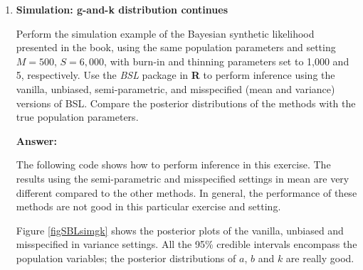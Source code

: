 \begin{enumerate}[leftmargin=*]
\begin{tcolorbox}[enhanced,width=4.67in,center upper,
	fontupper=\large\bfseries,drop shadow southwest,sharp corners]
\begin{VF}
\begin{lstlisting}[language=R]
df2 <- data.frame(Value = c(PostABC_AR[1:Sp,4], PostABC_ARown[1:Sp,4], PostABC_ARownRegAd[1:Sp,4]), Distribution = factor(c(rep("EasyABC", Sp), rep("ABC", Sp), rep("ABCAdj", Sp))))
deng <- ggplot(df2, aes(x = Value, color = Distribution)) +   geom_density(linewidth = 1) + geom_vline(xintercept = g, linetype = "dashed", color = "red", linewidth = 1) + labs(title = TeX("Posterior density plot: g"), x = TeX("$g$"), y = "Posterior density") +
scale_color_manual(values = c("blue", "red", "green")) +  theme_minimal() + theme(legend.title = element_blank())

df3 <- data.frame(Value = c(PostABC_AR[1:Sp,5], PostABC_ARown[1:Sp,5], PostABC_ARownRegAd[1:Sp,5]), Distribution = factor(c(rep("EasyABC", Sp), rep("ABC", Sp), rep("ABCAdj", Sp))))
denk <- ggplot(df3, aes(x = Value, color = Distribution)) +   geom_density(linewidth = 1) + geom_vline(xintercept = k, linetype = "dashed", color = "red", linewidth = 1) +
labs(title = TeX("Posterior density plot: k"), x = TeX("$k$"), y = "Posterior density") +
scale_color_manual(values = c("blue", "red", "green")) +  theme_minimal() + theme(legend.title = element_blank())

library(ggpubr)
ggarrange(dentheta, deng, denk, labels = c("A", "B", "C"), ncol = 3, nrow = 1,
legend = "bottom", common.legend = TRUE)
\end{lstlisting}
	\end{VF}
\end{tcolorbox}

\item \textbf{Simulation: g-and-k distribution continues}

Perform the simulation example of the Bayesian synthetic likelihood presented in the book, using the same population parameters and setting $M=500$, $S=6{,}000$, with burn-in and thinning parameters set to 1,000 and 5, respectively. Use the \textit{BSL} package in \textbf{R} to perform inference using the vanilla, unbiased, semi-parametric, and misspecified (mean and variance) versions of BSL. Compare the posterior distributions of the methods with the true population parameters.

\textbf{Answer:}

The following code shows how to perform inference in this exercise. The results using the semi-parametric and misspecified settings in mean are very different compared to the other methods. In general, the performance of these methods are not good in this particular exercise and setting.

Figure \ref{figSBLsimgk} shows the posterior plots of the vanilla, unbiased and misspecified in variance settings. All the 95\% credible intervals encompass the population variables; the posterior distributions of $a$, $b$ and $k$ are really good. 


\end{enumerate}
